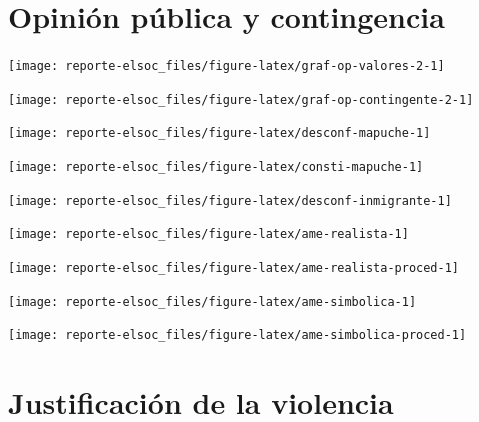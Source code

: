 \documentclass[
  12pt,
]{book}
\begin{document}
\hypertarget{opiniuxf3n-puxfablica-y-contingencia}{%
\section{Opinión pública y contingencia}\label{opiniuxf3n-puxfablica-y-contingencia}}

\begin{center}\texttt{[image: reporte-elsoc\_files/figure-latex/graf-op-valores-2-1]} \end{center}

\begin{center}\texttt{[image: reporte-elsoc\_files/figure-latex/graf-op-contingente-2-1]} \end{center}

\begin{center}\texttt{[image: reporte-elsoc\_files/figure-latex/desconf-mapuche-1]} \end{center}

\begin{center}\texttt{[image: reporte-elsoc\_files/figure-latex/consti-mapuche-1]} \end{center}

\begin{center}\texttt{[image: reporte-elsoc\_files/figure-latex/desconf-inmigrante-1]} \end{center}

\begin{center}\texttt{[image: reporte-elsoc\_files/figure-latex/ame-realista-1]} \end{center}

\begin{center}\texttt{[image: reporte-elsoc\_files/figure-latex/ame-realista-proced-1]} \end{center}

\begin{center}\texttt{[image: reporte-elsoc\_files/figure-latex/ame-simbolica-1]} \end{center}

\begin{center}\texttt{[image: reporte-elsoc\_files/figure-latex/ame-simbolica-proced-1]} \end{center}

\hypertarget{justificaciuxf3n-de-la-violencia}{%
\section{Justificación de la violencia}\label{justificaciuxf3n-de-la-violencia}}
\end{document}
